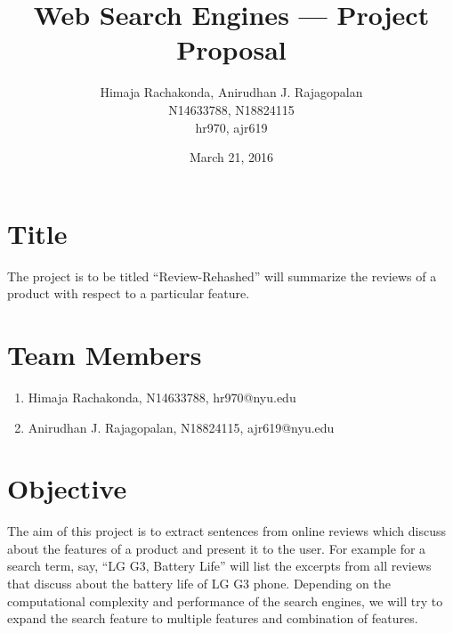 \documentclass{article}
\begin{document}
\title{Web Search Engines --- Project Proposal}
\date{March 21, 2016}
\author{Himaja Rachakonda, Anirudhan J. Rajagopalan\\ N14633788, N18824115\\ hr970, ajr619}
\maketitle
\newpage

\section{Title}
The project is to be titled ``Review-Rehashed'' will summarize the reviews of a product with respect to a particular feature.

\section{Team Members}
\begin{enumerate}
  \item Himaja Rachakonda, N14633788, hr970@nyu.edu
  \item Anirudhan J. Rajagopalan, N18824115, ajr619@nyu.edu
\end{enumerate}

\section{Objective}
The aim of this project is to extract sentences from online reviews which discuss about the features of a product and present it to the user.  
For example for a search term, say, ``LG G3, Battery Life'' will list the excerpts from all reviews that discuss about the battery life of LG G3 phone. 
Depending on the computational complexity and performance of the search engines, we will try to expand the search feature to multiple features and combination of features.
\end{document}
